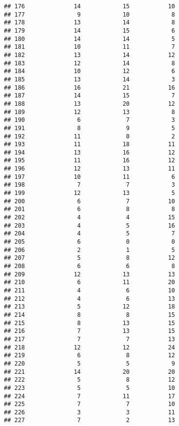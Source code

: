 \documentclass[
]{article}
\begin{document}
\begin{verbatim}
## 176              14            15           10
## 177               9            10            8
## 178              13            14            8
## 179              14            15            6
## 180              14            14            5
## 181              10            11            7
## 182              13            14           12
## 183              12            14            8
## 184              10            12            6
## 185              13            14            3
## 186              16            21           16
## 187              14            15            7
## 188              13            20           12
## 189              12            13            8
## 190               6             7            3
## 191               8             9            5
## 192              11             0            2
## 193              11            18           11
## 194              13            16           12
## 195              11            16           12
## 196              12            13           11
## 197              10            11            6
## 198               7             7            3
## 199              12            13            5
## 200               6             7           10
## 201               6             8            8
## 202               4             4           15
## 203               4             5           16
## 204               4             5            7
## 205               6             0            0
## 206               2             1            5
## 207               5             8           12
## 208               6             6            8
## 209              12            13           13
## 210               6            11           20
## 211               4             6           10
## 212               4             6           13
## 213               5            12           18
## 214               8             8           15
## 215               8            13           15
## 216               7            13           15
## 217               7             7           13
## 218              12            12           24
## 219               6             8           12
## 220               5             5            9
## 221              14            20           20
## 222               5             8           12
## 223               5             5           10
## 224               7            11           17
## 225               7             7           10
## 226               3             3           11
## 227               7             2           13

\end{verbatim}
\end{document}

